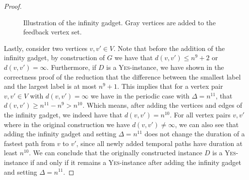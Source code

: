\documentclass[a4paper,UKenglish,cleveref, autoref, thm-restate,anonymous]{lipics-v2021}
\begin{document}
\begin{proof}
\begin{figure}[t]
    \caption{Illustration of the infinity gadget. Gray vertices are added to the feedback vertex set.}\label{fig:hardness2}
\end{figure}

Lastly, consider two vertices $v,v'\in V$. Note that before the addition of the infinity gadget, by construction of $G$ we have that $d(v,v')\le n^9+2$ or $d(v,v')=\infty$. Furthermore, if $D$ is a \textsc{Yes}-instance, we have shown in the correctness proof of the reduction that the difference between the smallest label and the largest label is at most $n^9+1$. This implies that for a vertex pair $v,v'\in V$ with $d(v,v')=\infty$ we have in the periodic case with $\Delta=n^{11}$, that $d(v,v')\ge n^{11}-n^9>n^{10}$. Which means, after adding the vertices and edges of the infinity gadget, we indeed have that $d(v,v')=n^{10}$. For all vertex pairs $v,v'$ where in the original construction we have $d(v,v')\neq\infty$, we can also see that adding the infinity gadget and setting $\Delta=n^{11}$ does not change the duration of a fastest path from $v$ to $v'$, since all newly added temporal paths have duration at least $n^{10}$. We can conclude that the originally constructed instance $D$ is a \textsc{Yes}-instance if and only if it remains a \textsc{Yes}-instance after adding the infinity gadget and setting $\Delta=n^{11}$.
\end{proof}


\end{document}
